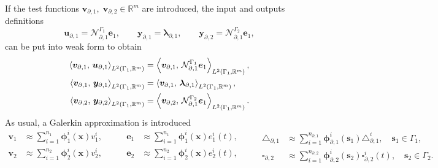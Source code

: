 If the test functions $\bm{v}_{\partial, 1}, \; \bm{v}_{\partial, 2} \in  \mathbb{R}^m$ are introduced, the input and outputs definitions
\begin{equation}
\bm{u}_{\partial, 1}=\mathcal{N}_{\partial, 1}^{\Gamma_1}\bm{e}_{1}, \qquad \bm{y}_{\partial, 1}=\bm{\lambda}_{\partial, 1}, \qquad \bm{y}_{\partial, 2}=\mathcal{N}_{\partial, 1}^{\Gamma_2}\bm{e}_{1},
\end{equation}  
can be put into weak form to obtain
\begin{equation}\label{eq:inpout_mixed}
\begin{aligned}
\inner[L^2(\Gamma_1, \mathbb{R}^m)]{\bm{v}_{\partial, 1}}{\bm{u}_{\partial, 1}} &= \inner[L^2(\Gamma_1, \mathbb{R}^m)]{\bm{v}_{\partial, 1}}{\mathcal{N}_{\partial, 1}^{\Gamma_1}\bm{e}_{1}}, \\
\inner[L^2(\Gamma_1, \mathbb{R}^m)]{\bm{v}_{\partial, 1}}{\bm{y}_{\partial, 1}} &= \inner[L^2(\Gamma_1, \mathbb{R}^m)]{\bm{v}_{\partial, 1}}{\bm{\lambda}_{\partial, 1}}, \\
\inner[L^2(\Gamma_1, \mathbb{R}^m)]{\bm{v}_{\partial, 2}}{\bm{y}_{\partial, 2}} &= \inner[L^2(\Gamma_1, \mathbb{R}^m)]{\bm{v}_{\partial, 2}}{\mathcal{N}_{\partial, 1}^{\Gamma_2}\bm{e}_{1}}. \\
\end{aligned}
\end{equation}
As usual, a Galerkin approximation is introduced    
\begin{equation}\label{eq:approx_vaeb_mixed}
\begin{aligned}
\bm{v}_1 &\approx \sum_{i=1}^{n_1} \bm{\phi}_1^i(\bm{x}) v_1^i, \\
\bm{v}_2 &\approx \sum_{i=1}^{n_2} \bm{\phi}_2^i(\bm{x}) v_2^i, \\
\end{aligned}  \qquad 
\begin{aligned}
\bm{e}_1 &\approx \sum_{i=1}^{n_1} \bm{\phi}_1^i(\bm{x}) e_1^i(t), \\
\bm{e}_2 &\approx \sum_{i=1}^{n_2} \bm{\phi}_2^i(\bm{x}) e_2^i(t),  \\
\end{aligned} \qquad 
\begin{aligned}
\bm{\triangle}_{\partial, 1} &\approx \sum_{i=1}^{n_{\partial, 1}} \bm{\phi}_{\partial, 1}^i(\bm{s}_1) \triangle_{\partial, 1}^i, \quad \bm{s}_1 \in \Gamma_1, \\
\bm{\square}_{\partial, 2} &\approx \sum_{i=1}^{n_{\partial, 2}} \bm{\phi}_{\partial, 2}^i(\bm{s}_2) \square_{\partial, 2}^i(t), \quad \bm{s}_2 \in \Gamma_2.
\end{aligned}
\end{equation}
